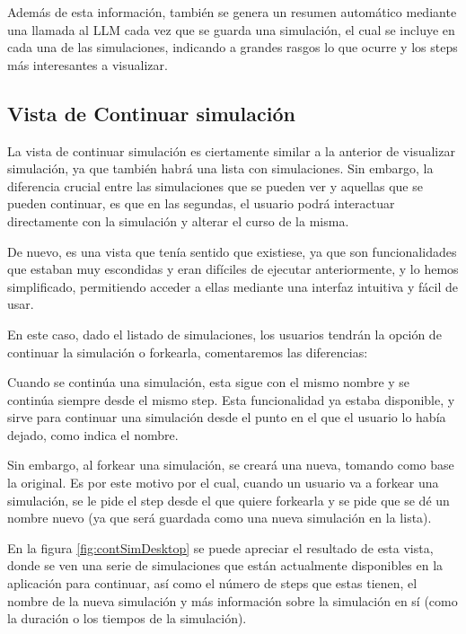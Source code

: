 Además de esta información, también se genera un resumen automático mediante una llamada al LLM cada vez que se guarda una simulación, el cual se incluye en cada una de las simulaciones, indicando a grandes rasgos lo que ocurre y los steps más interesantes a visualizar.


\subsection{Vista de Continuar simulación}

La vista de continuar simulación es ciertamente similar a la anterior de visualizar simulación, ya que también habrá una lista con simulaciones. Sin embargo, la diferencia crucial entre las simulaciones que se pueden ver y aquellas que se pueden continuar, es que en las segundas, el usuario podrá interactuar directamente con la simulación y alterar el curso de la misma.

De nuevo, es una vista que tenía sentido que existiese, ya que son funcionalidades que estaban muy escondidas y eran difíciles de ejecutar anteriormente, y lo hemos simplificado, permitiendo acceder a ellas mediante una interfaz intuitiva y fácil de usar.

En este caso, dado el listado de simulaciones, los usuarios tendrán la opción de continuar la simulación o forkearla, comentaremos las diferencias:

Cuando se continúa una simulación, esta sigue con el mismo nombre y se continúa siempre desde el mismo step. Esta funcionalidad ya estaba disponible, y sirve para continuar una simulación desde el punto en el que el usuario lo había dejado, como indica el nombre.

Sin embargo, al forkear una simulación, se creará una nueva, tomando como base la original. Es por este motivo por el cual, cuando un usuario va a forkear una simulación, se le pide el step desde el que quiere forkearla y se pide que se dé un nombre nuevo (ya que será guardada como una nueva simulación en la lista).

 En la figura \ref{fig:contSimDesktop} se puede apreciar el resultado de esta vista, donde se ven una serie de simulaciones que están actualmente disponibles en la aplicación para continuar, así como el número de steps que estas tienen, el nombre de la nueva simulación y más información sobre la simulación en sí (como la duración o los tiempos de la simulación).
 
